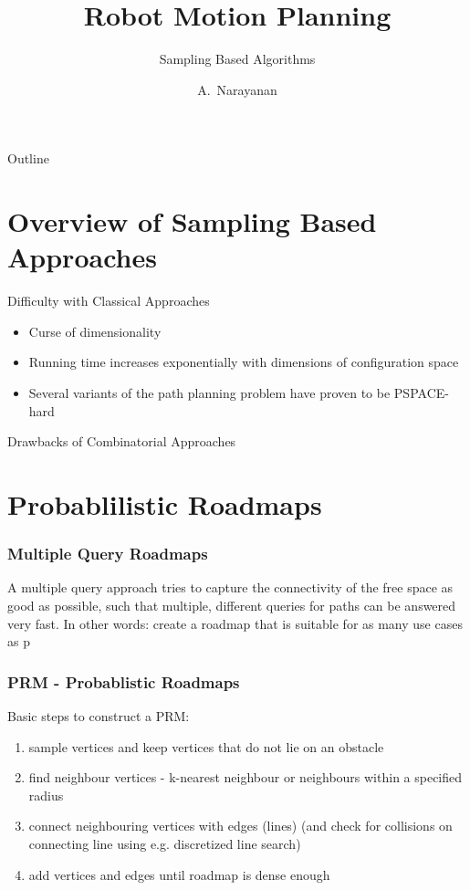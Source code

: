 \documentclass{beamer}
\title[RMP v\var{version}]
{Robot Motion Planning}
\subtitle
{Sampling Based Algorithms}
\author[Narayanan]
{A.~Narayanan\inst{1}}
\institute[Technical University of Munich]
{
  \inst{1}
  Department of Informatics\\
}
\begin{document}
\begin{frame}
    \titlepage
  \end{frame}
  
  \begin{frame}{Outline}
    \tableofcontents
  \end{frame}

  \section{Overview of Sampling Based Approaches}

  \begin{frame}{Difficulty with Classical Approaches}
    \begin{itemize}
      \item Curse of dimensionality
      \item Running time increases exponentially with dimensions of configuration space
      \item Several variants of the path planning problem have proven to be PSPACE-hard
    \end{itemize}
  \end{frame}

  \begin{frame}{Drawbacks of Combinatorial Approaches}
    
  \end{frame}

  \section[PRMs]{Probablilistic Roadmaps}

  \begin{frame}
    \frametitle{Multiple Query Roadmaps}
    A multiple query approach tries to capture the connectivity of the
free space as good as possible, such that multiple, different queries
for paths can be answered very fast. In other words: create a
roadmap that is suitable for as many use cases as p
    
  
  \end{frame}

  \begin{frame}
    \frametitle{PRM - Probablistic Roadmaps}
    Basic steps to construct a PRM:
    \begin{enumerate}
      \item sample vertices and keep vertices that do not lie on an obstacle
      \item find neighbour vertices - k-nearest neighbour or neighbours within a specified radius
      \item connect neighbouring vertices with edges (lines) (and check for collisions on connecting line using e.g. discretized line search)
      \item add vertices and edges until roadmap is dense enough
    \end{enumerate}
  
  \end{frame}
\end{document}
